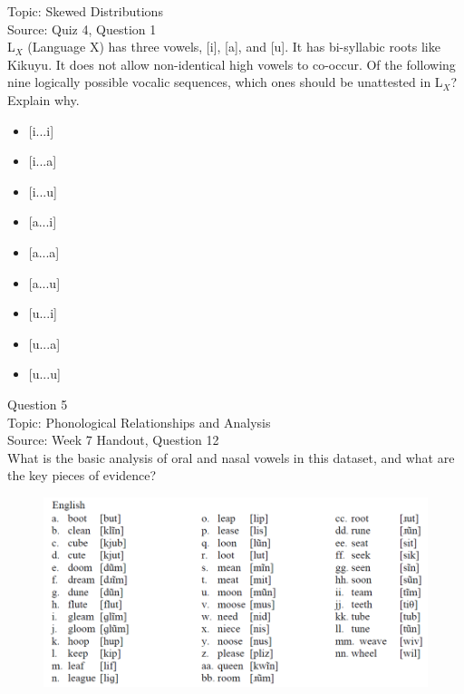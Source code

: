 \documentclass[12pt]{article}
\begin{document}
Topic: Skewed Distributions\\
Source: Quiz 4, Question 1\\

L$_X$ (Language X) has three vowels, [i], [a], and [u]. It has bi-syllabic roots like Kikuyu. It does not allow non-identical high vowels to co-occur. Of the following nine logically possible vocalic sequences, which ones should be unattested in L$_X$? Explain why.\\

\begin{itemize} \item {[i...i]} \item {[i...a]} \item {[i...u]} \item {[a...i]} \item {[a...a]} \item {[a...u]} \item {[u...i]} \item {[u...a]} \item {[u...u]} \end{itemize}


\newpage

{\large Question 5}\\

Topic: Phonological Relationships and Analysis\\
Source: Week 7 Handout, Question 12\\

What is the basic analysis of oral and nasal vowels in this dataset, and what are the key pieces of evidence?\\

\begin{figure}[H]
\includegraphics{../images/english12.png}
\end{figure}

\newpage
\end{document}
